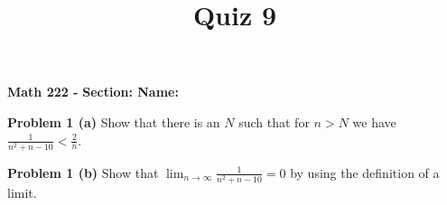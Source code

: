 \documentclass{article}
\title{Quiz 9}
\begin{document}
\begin{center}\makeatletter %
{ \bf Math 222 - \@title }
{ \bf \hfill Section: \underline{\hspace{2cm}} \hfill Name: \underline{\hspace{5cm}} }
\end{center}
\vspace{0.5cm}
{\bf Problem 1 (a)} \qquad Show that there is an $N$ such that for $n > N$ we have
$\displaystyle \frac{1}{n^2 + n - 10} < \frac{2}{n}$.\vfill

{\bf Problem 1 (b)} \qquad Show that $\displaystyle \lim_{n \to \infty} \frac{1}{n^2 + n - 10} = 0$
by using the definition of a limit.\vfill
\end{document}
